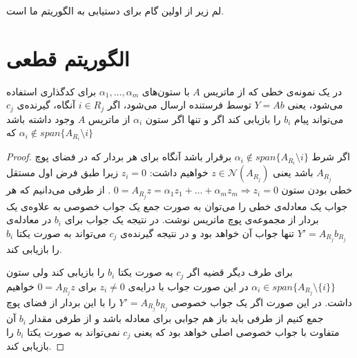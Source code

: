 \subsubsection{}
لم زیر از
\cite{7176784}
اولین گام برای دستیابی به الگوریتم ما است.
\section{
	الگوریتم قطعی
	}
\begin{lemma}
	\label{lemma:algebraicconstraint}
	در یک نمونه‌ی
	\picod
	خطی که از ماتریس
	$A$
	با ستون‌های 
	$\alpha_1, \ldots, \alpha_m$
	برای کدگذاری استفاده می‌شود، یعنی
	$Y = A b$
	توسط فرستنده ارسال می‌شود، اگر
	$i \in R_j$
	آنگاه، گیرنده‌‌ی 
	$c_j$
	می‌تواند پیام 
	$b_i$
	را بازیابی کند اگر و تنها اگر ستون
	$\alpha_i$
	از ماتریس
	$A$
	وجود داشته باشد که
	$\alpha_i \notin span\{A_{R_i} \setminus i\}$
\end{lemma}
\begin{proof}
	اگر شرط
		$\alpha_i \notin span\{A_{R_i} \setminus i\}$
		برقرار باشد آنگاه برای هر بردار که در فضای پوچ
		$A_{R_j}$
		باشد یعنی
		$z \in \mathcal{N}(A_{R_j})$
		خواهیم داشت:
		$z_i = 0$
		زیرا طبق فرض اول مستقل خطی بودن ستون
		$0 = A_{R_j} z  = \alpha_1 z_1 + \ldots + \alpha_m z_m \Rightarrow z_i = 0$
		.  از طرفی می‌دانیم که هر جواب یک معادله‌ی خطی را می‌توان به صورت جمع یک جواب خصوصی به علاوه‌ی یک بردار از مجموعه‌ی پوچ ماتریس نوشت. در نتیجه یک جواب برای 
		$b_i$
		در معادله‌ی
		$Y' = A_{R_j} b_{R_j}$
		تنها جواب آن خواهد بود و در نتیجه گیرنده‌ی
		$c_j$
		می‌تواند به صورت یکتا
		$b_i$
		را بازیابی کند.
		
		برای طرف دیگر قضیه اگر 
		$c_j$
		به صورت یکتا
		$b_i$
		را بازیابی کند ولی ستون
		$\alpha_i \in span\{A_{R_j} \setminus \{i\}\}$
		در این صورت جواب با درایه‌ی
		$z_i \neq 0$
		برای
		$0 = A_{R_j} z$
		خواهیم داشت. در این صورت اگر یک جواب خصوصی
				$Y' = A_{R_j} b_{R_j}$
				را با این بردار از فضای پوچ جمع کنیم از طرفی باید باز هم جوابی برای معادله باشد و از طرفی مقدار
				$b_i$
				آن متفاوت با جواب خصوصی اصلی خواهد بود که یعنی 
				$c_j$
				نمی‌تواند به صورت یکتا
				$b_i$
				را بازیابی کند.	
\end{proof}

